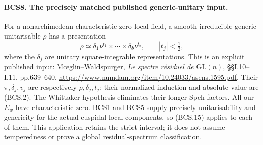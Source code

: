 \documentclass[11pt,a4paper]{article}
\numberwithin{equation}{section}
\theoremstyle{remark}\newtheorem{remark}[theorem]{Remark}
\begin{document}

\paragraph{BCS8. The precisely matched published generic-unitary input.}
\label{claim:BCS8}
For a nonarchimedean characteristic-zero local field, a smooth
irreducible generic unitarisable \(\rho\) has a presentation
\[
       \rho\simeq\delta_1\nu^{t_1}\times\cdots\times
                   \delta_b\nu^{t_b},\qquad |t_j|<\tfrac12,
 \tag{BCS.15}
\]
where the \(\delta_j\) are unitary square-integrable representations.
This is an explicit published input: M\oe glin--Waldspurger,
\emph{Le spectre r\'esiduel de \(\mathrm{GL}(n)\)},
\S\S I.10--I.11, pp.639--640,
\url{https://www.numdam.org/item/10.24033/asens.1595.pdf}.
Their \(\pi,\delta_j,v_j\) are respectively
\(\rho,\delta_j,t_j\); their normalized induction and absolute
value are (BCS.2).  The Whittaker hypothesis eliminates their longer
Speh factors.  All our \(E_w\) have characteristic zero.  BCS1 and
BCS5 supply precisely unitarisability and genericity for the actual
cuspidal local components, so (BCS.15) applies to each of them.
This application retains the strict interval; it does not assume
temperedness or prove a global residual-spectrum classification.

\end{document}
